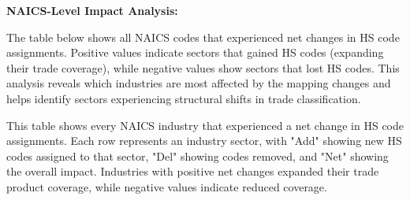 \documentclass[11pt]{article}
\begin{document}
\textbf{NAICS-Level Impact Analysis:}

The table below shows all NAICS codes that experienced net changes in HS code assignments. Positive values indicate sectors that gained HS codes (expanding their trade coverage), while negative values show sectors that lost HS codes. This analysis reveals which industries are most affected by the mapping changes and helps identify sectors experiencing structural shifts in trade classification.


This table shows every NAICS industry that experienced a net change in HS code assignments. Each row represents an industry sector, with "Add" showing new HS codes assigned to that sector, "Del" showing codes removed, and "Net" showing the overall impact. Industries with positive net changes expanded their trade product coverage, while negative values indicate reduced coverage.
\end{document}
